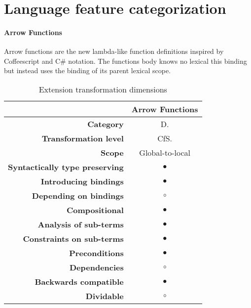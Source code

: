
\chapter{Language feature categorization} %

\label{AppendixB} %



\subsubsection{Arrow Functions}
Arrow functions\cite[14.2]{SpecJS} are the new lambda-like function definitions inspired by Coffeescript and C\# notation. The functions body knows no lexical this binding but instead uses the binding of its parent lexical scope.

\begin{table}[h]
\centering
\caption{Extension transformation dimensions}
\label{arrow-function-table}
\begin{tabular}{@{}rc@{}}
\toprule
                                       & \multicolumn{1}{l}{\textbf{Arrow Functions}} \\ \midrule
\textbf{Category}                      & D.
\\
\textbf{Transformation level}          & CfS.                          \\
\textbf{Scope}                         & Global-to-local                               \\
\textbf{Syntactically type preserving} & $\bullet$                                          \\
\textbf{Introducing bindings}          & $\bullet$                                          \\%
\textbf{Depending on bindings}         & $\circ$                                           \\
\textbf{Compositional}                 & $\bullet$                                          \\
\textbf{Analysis of sub-terms}          & $\bullet$                                          \\
\textbf{Constraints on sub-terms}       & $\bullet$                                           \\
\textbf{Preconditions}                 & $\bullet$                                          \\
\textbf{Dependencies}                  & $\circ$                                           \\
\textbf{Backwards compatible}          & $\bullet$                                          \\
\textbf{Dividable}                     & $\circ$                                           \\ \bottomrule
\end{tabular}
\end{table}

